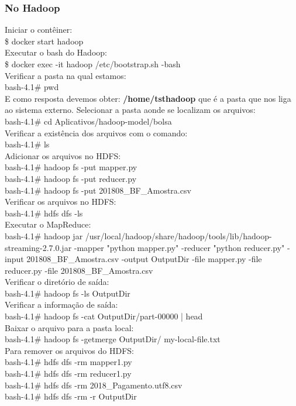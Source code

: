 \documentclass[a4paper,11pt]{article}
\begin{document}
\subsubsection{No Hadoop}
Iniciar o contêiner: \\
{\ttfamily\$ docker start hadoop} \\[2mm]
Executar o bash do Hadoop: \\
{\ttfamily\$ docker exec -it hadoop /etc/bootstrap.sh -bash} \\[2mm]
Verificar a pasta na qual estamos: \\
{\ttfamily bash-4.1\# pwd} \\[2mm]
E como resposta devemos obter: \textbf{/home/tsthadoop} que é a pasta que nos liga ao sistema externo.
Selecionar a pasta aonde se localizam os arquivos: \\
{\ttfamily bash-4.1\# cd Aplicativos/hadoop-model/bolsa} \\[2mm]
Verificar a existência dos arquivos com o comando: \\
{\ttfamily bash-4.1\# ls} \\[2mm]
Adicionar os arquivos no HDFS: \\
{\ttfamily bash-4.1\# hadoop fs -put mapper.py \\
bash-4.1\# hadoop fs -put reducer.py \\
bash-4.1\# hadoop fs -put 201808\_BF\_Amostra.csv} \\[2mm]
Verificar os arquivos no HDFS: \\
{\ttfamily bash-4.1\# hdfs dfs -ls} \\[2mm]
Executar o MapReduce: \\
{\ttfamily bash-4.1\# hadoop jar /usr/local/hadoop/share/hadoop/tools/lib/hadoop-streaming-2.7.0.jar -mapper "python mapper.py" \- -reducer "python reducer.py" \- -input 201808\_BF\_Amostra.csv -output OutputDir -file mapper.py -file reducer.py -file 201808\_BF\_Amostra.csv} \\[2mm]
Verificar o diretório de saída: \\
{\ttfamily bash-4.1\# hadoop fs -ls OutputDir} \\[2mm]
Verificar a informação de saída: \\
{\ttfamily bash-4.1\# hadoop fs -cat OutputDir/part-00000 | head} \\[2mm]
Baixar o arquivo para a pasta local: \\
{\ttfamily bash-4.1\# hadoop fs -getmerge OutputDir/ my-local-file.txt} \\[2mm]
Para remover os arquivos do HDFS: \\
{\ttfamily bash-4.1\# hdfs dfs -rm mapper1.py \\
bash-4.1\# hdfs dfs -rm reducer1.py \\
bash-4.1\# hdfs dfs -rm 2018\_Pagamento.utf8.csv \\
bash-4.1\# hdfs dfs -rm -r OutputDir}
\end{document}
